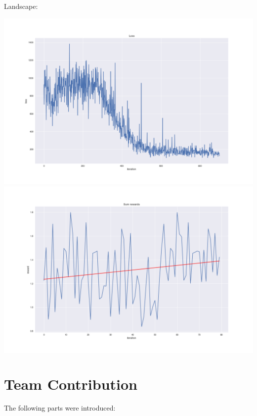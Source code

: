 \documentclass{article}
\begin{document}
Landscape:

\includegraphics[scale=0.2]{plots/landscape_loss.png}
\includegraphics[scale=0.2]{plots/landscape_rewards.png}

\section{Team Contribution}

The following parts were introduced:
\end{document}
